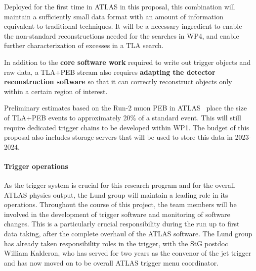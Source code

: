 Deployed for the first time in ATLAS in this proposal, this combination will maintain a sufficiently small data format with an amount of information equivalent to traditional techniques. It will be a necessary ingredient to enable the non-standard reconstructions needed for the searches in WP4, and enable further characterization of excesses in a TLA search. 

In addition to the \textbf{core software work} required to write out trigger objects and raw data, a TLA+PEB stream also requires \textbf{adapting the detector reconstruction software} so that it can correctly reconstruct objects only within a certain region of interest. 

Preliminary estimates based on the Run-2 muon PEB in ATLAS~\cite{PEBIsThereEvenAPaper} place the size of TLA+PEB events to approximately 20\% of a standard event. This will still require dedicated trigger chains to be developed within WP1. The budget of this proposal also includes storage servers that will be used to store this data in 2023-2024. 


\paragraph{Trigger operations}

As the trigger system is crucial for this research program and for the overall ATLAS physics output, the Lund group will maintain a leading role in its operations. 
Throughout the course of this project, the team members will be involved in the development of trigger software and monitoring of software changes. This is a particularly crucial responsibility during the run up to first data taking, after the complete overhaul of the ATLAS software. 
The Lund group has already taken responsibility roles in the trigger, with the StG postdoc William Kalderon, who has served for two years as the convenor of the jet trigger and has now moved on to be overall ATLAS trigger menu coordinator. 









